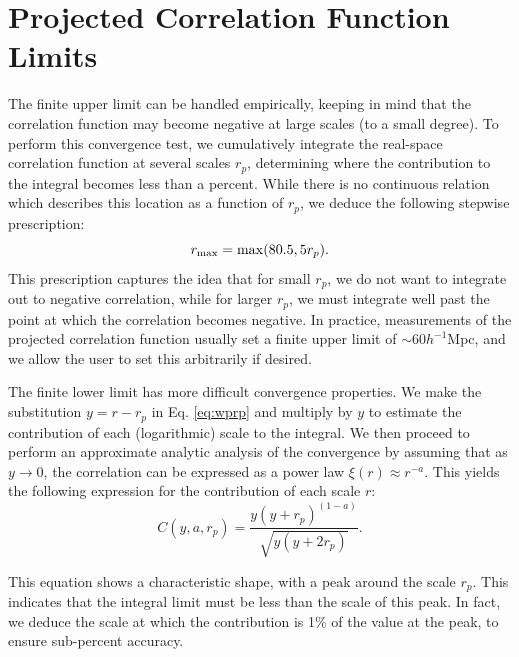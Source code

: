 \documentclass[5p,aas_macros]{elsarticle}
\begin{document}
\section{Projected Correlation Function Limits}
\label{app:proj}
The finite upper limit can be handled empirically, keeping in mind that the correlation function may become negative at large scales (to a small degree). 
To perform this convergence test, we cumulatively integrate the real-space correlation function at several scales $r_p$, determining where the contribution to the integral becomes less than a percent. 
While there is no continuous relation which describes this location as a function of $r_p$, we deduce the following stepwise prescription:
\begin{equation}
	r_{\rm max} = {\rm max}(80.5,5r_p).
\end{equation}
This prescription captures the idea that for small $r_p$, we do not want to integrate out to negative correlation, while for larger $r_p$, we must integrate well past the point at which the correlation becomes negative. In practice, measurements of the projected correlation function usually set a finite upper limit of $\sim 60 h^{-1}$Mpc, and we allow the user to set this arbitrarily if desired.

The finite lower limit has more difficult convergence properties. We make the substitution $y=r-r_p$ in Eq. \ref{eq:wprp} and multiply by $y$ to estimate the contribution of each (logarithmic) scale to the integral. We then proceed to perform an approximate analytic analysis of the convergence by assuming that as $y \rightarrow 0$, the correlation can be expressed as a power law $\xi(r) \approx r^{-a}$. This yields the following expression for the contribution of each scale $r$:
 \begin{equation}
 	\label{eq:projcorrcontr}
 	C(y,a,r_p) = \frac{y(y+r_p)^{(1-a)}}{\sqrt{y(y+2r_p)}}.
 \end{equation} 

This equation shows a characteristic shape, with a peak around the scale $r_p$. 
This indicates that the integral limit must be less than the scale of this peak.
In fact, we deduce the scale at which the contribution is 1\% of the value at the peak, to ensure sub-percent accuracy.
\end{document}

